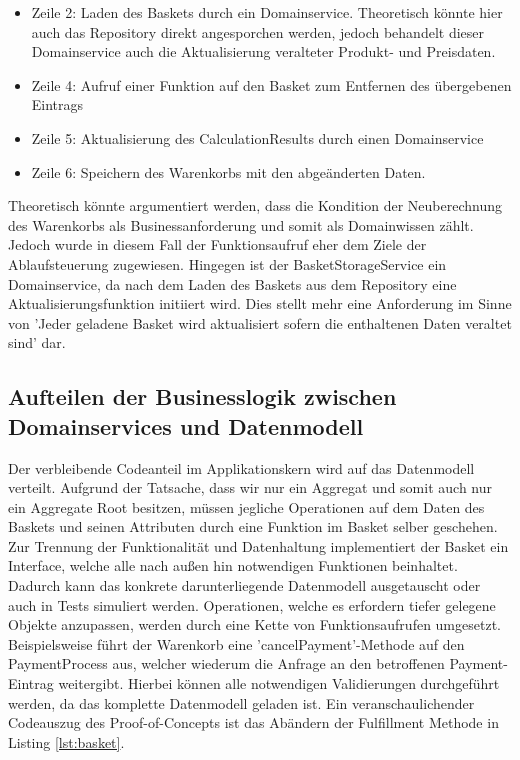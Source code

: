 \begin{itemize}[noitemsep,nolistsep]
	\item Zeile 2: Laden des Baskets durch ein Domainservice. Theoretisch könnte hier auch das Repository direkt angesporchen werden, jedoch behandelt dieser Domainservice auch die Aktualisierung veralteter Produkt- und Preisdaten.
	\item Zeile 4: Aufruf einer Funktion auf den Basket zum Entfernen des übergebenen Eintrags
	\item Zeile 5: Aktualisierung des CalculationResults durch einen Domainservice
	\item Zeile 6: Speichern des Warenkorbs mit den abgeänderten Daten.
\end{itemize}

Theoretisch könnte argumentiert werden, dass die Kondition der Neuberechnung des Warenkorbs als Businessanforderung und somit als Domainwissen zählt. Jedoch wurde in diesem Fall der Funktionsaufruf eher dem Ziele der Ablaufsteuerung zugewiesen. Hingegen ist der BasketStorageService ein Domainservice, da nach dem Laden des Baskets aus dem Repository eine Aktualisierungsfunktion initiiert wird. Dies stellt mehr eine Anforderung im Sinne von 'Jeder geladene Basket wird aktualisiert sofern die enthaltenen Daten veraltet sind' dar. 

\subsection{Aufteilen der Businesslogik zwischen Domainservices und Datenmodell}

Der verbleibende Codeanteil im Applikationskern wird auf das Datenmodell verteilt. Aufgrund der Tatsache, dass wir nur ein Aggregat und somit auch nur ein Aggregate Root besitzen, müssen jegliche Operationen auf dem Daten des Baskets und seinen Attributen durch eine Funktion im Basket selber geschehen. Zur Trennung der Funktionalität und Datenhaltung implementiert der Basket ein Interface, welche alle nach außen hin notwendigen Funktionen beinhaltet. Dadurch kann das konkrete darunterliegende Datenmodell ausgetauscht oder auch in Tests simuliert werden. Operationen, welche es erfordern tiefer gelegene Objekte anzupassen, werden durch eine Kette von Funktionsaufrufen umgesetzt. Beispielsweise führt der Warenkorb eine 'cancelPayment'-Methode auf den PaymentProcess aus, welcher wiederum die Anfrage an den betroffenen Payment-Eintrag weitergibt. Hierbei können alle notwendigen Validierungen durchgeführt werden, da das komplette Datenmodell geladen ist. Ein veranschaulichender Codeauszug des Proof-of-Concepts ist das Abändern der Fulfillment Methode in Listing \ref{lst:basket}.

